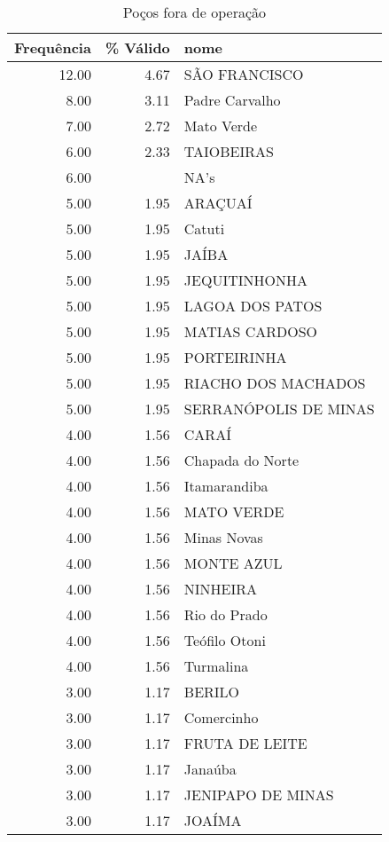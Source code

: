 \documentclass[a4paper, 12pt, openright, oneside, english, brazil, article]{abntex2}
\begin{document}
	\begin{scriptsize}
	\begin{longtable}{rrl}
		\caption{Poços fora de operação} \\ 
		\hline
		Frequência & \% Válido & nome \\ 
		\hline
		12.00 & 4.67 & SÃO FRANCISCO \\ 
		8.00 & 3.11 & Padre Carvalho \\ 
		7.00 & 2.72 & Mato Verde \\ 
		6.00 & 2.33 & TAIOBEIRAS \\ 
		6.00 &  & NA's \\ 
		5.00 & 1.95 & ARAÇUAÍ \\ 
		5.00 & 1.95 & Catuti \\ 
		5.00 & 1.95 & JAÍBA \\ 
		5.00 & 1.95 & JEQUITINHONHA \\ 
		5.00 & 1.95 & LAGOA DOS PATOS \\ 
		5.00 & 1.95 & MATIAS CARDOSO \\ 
		5.00 & 1.95 & PORTEIRINHA \\ 
		5.00 & 1.95 & RIACHO DOS MACHADOS \\ 
		5.00 & 1.95 & SERRANÓPOLIS DE MINAS \\ 
		4.00 & 1.56 & CARAÍ \\ 
		4.00 & 1.56 & Chapada do Norte \\ 
		4.00 & 1.56 & Itamarandiba \\ 
		4.00 & 1.56 & MATO VERDE \\ 
		4.00 & 1.56 & Minas Novas \\ 
		4.00 & 1.56 & MONTE AZUL \\ 
		4.00 & 1.56 & NINHEIRA \\ 
		4.00 & 1.56 & Rio do Prado \\ 
		4.00 & 1.56 & Teófilo Otoni \\ 
		4.00 & 1.56 & Turmalina \\ 
		3.00 & 1.17 & BERILO \\ 
		3.00 & 1.17 & Comercinho \\ 
		3.00 & 1.17 & FRUTA DE LEITE \\ 
		3.00 & 1.17 & Janaúba \\ 
		3.00 & 1.17 & JENIPAPO DE MINAS \\ 
		3.00 & 1.17 & JOAÍMA \\ 

\end{longtable}
\end{scriptsize}
\end{document}
